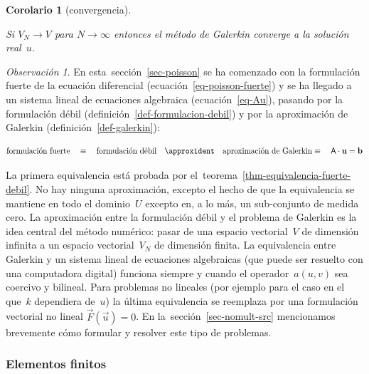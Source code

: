 \documentclass[
  12pt,
  a4paper,
  table]{scrbook}
\theoremstyle{plain}
\theoremstyle{definition}
\theoremstyle{plain}
\theoremstyle{plain}
\newtheorem{corollary}{Corolario}[chapter]
\theoremstyle{remark}
\newtheorem*{remark}{Observación}
\begin{document}
\begin{corollary}[convergencia]\protect\hypertarget{cor-galerkin-convergencia}{}\label{cor-galerkin-convergencia}

Si \(V_N \rightarrow V\) para \(N \rightarrow \infty\) entonces el
método de Galerkin converge a la solución real~\(u\).

\end{corollary}

\begin{remark}

En esta~sección~\ref{sec-poisson} se ha comenzado con la formulación
fuerte de la ecuación diferencial (ecuación~\ref{eq-poisson-fuerte}) y
se ha llegado a un sistema lineal de ecuaciones algebraica
(ecuación~\ref{eq-Au}), pasando por la formulación débil
(definición~\ref{def-formulacion-debil}) y por la aproximación de
Galerkin (definición~\ref{def-galerkin}):

\[
\text{formulación fuerte} \quad \equiv \quad
\text{formulación débil}  \quad \approxident \quad
\text{aproximación de Galerkin} \equiv \quad 
\mat{A} \cdot \vec{u} = \vec{b}
\]

La primera equivalencia está probada por
el~teorema~\ref{thm-equivalencia-fuerte-debil}. No hay ninguna
aproximación, excepto el hecho de que la equivalencia se mantiene en
todo el dominio~\(U\) excepto en, a lo más, un sub-conjunto de medida
cero. La aproximación entre la formulación débil y el problema de
Galerkin es la idea central del método numérico: pasar de una espacio
vectorial~\(V\) de dimensión infinita a un espacio vectorial~\(V_N\) de
dimensión finita. La equivalencia entre Galerkin y un sistema lineal de
ecuaciones algebraicas (que puede ser resuelto con una computadora
digital) funciona siempre y cuando el operador~\(a(u,v)\) sea coercivo y
bilineal. Para problemas no lineales (por ejemplo para el caso en el
que~\(k\) dependiera de~\(u\)) la última equivalencia se reemplaza por
una formulación vectorial no lineal \(\vec{F}(\vec{u})=0\). En
la~sección~\ref{sec-nomult-src} mencionamos brevemente cómo formular y
resolver este tipo de problemas.

\end{remark}

\hypertarget{sec-fem}{%
\subsubsection{Elementos finitos}\label{sec-fem}}
\end{document}
